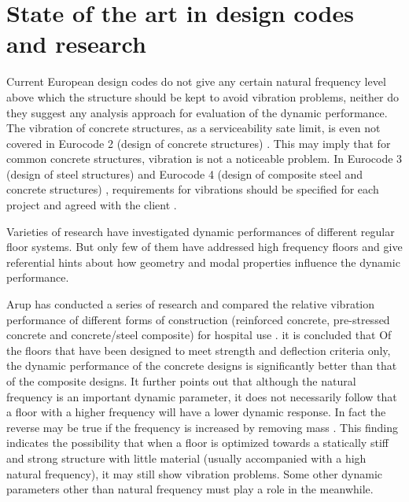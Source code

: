\section{State of the art in design codes and research}
Current European design codes do not give any certain natural frequency level above which the structure should be kept to avoid vibration problems, neither do they suggest any analysis approach for evaluation of the dynamic performance. The vibration of concrete structures, as a serviceability sate limit, is even not covered in Eurocode 2 (design of concrete structures) \cite{european2004eurocode2}. This may imply that for common concrete structures, vibration is not a noticeable problem. In Eurocode 3 (design of steel structures)  and Eurocode 4 (design of composite steel and concrete structures) , requirements for vibrations should be specified for each project and agreed with the client \cite{european2005eurocode3}\cite{european2004eurocode4}.

Varieties of research have investigated dynamic performances of different regular floor systems. But only few of them have addressed high frequency floors and give referential hints about how geometry and modal properties influence the dynamic performance.  

Arup has conducted a series of research and compared the relative vibration performance of different forms of construction (reinforced concrete, pre-stressed concrete and concrete/steel composite) for hospital use \cite{arup2004hospital}. it is concluded that Of the floors that have been designed to meet strength and deflection criteria only, the dynamic performance of the concrete designs is significantly better than that of the composite designs. It further points out that although the natural frequency is an important dynamic parameter, it does not necessarily follow that a floor with a higher frequency will have a lower dynamic response. In fact the reverse may be true if the frequency is increased by removing mass . This finding indicates the possibility that when a floor is optimized towards a statically stiff and strong structure with little material (usually accompanied with a high natural frequency), it may still show vibration problems. Some other dynamic parameters other than natural frequency must play a role in the meanwhile. 

